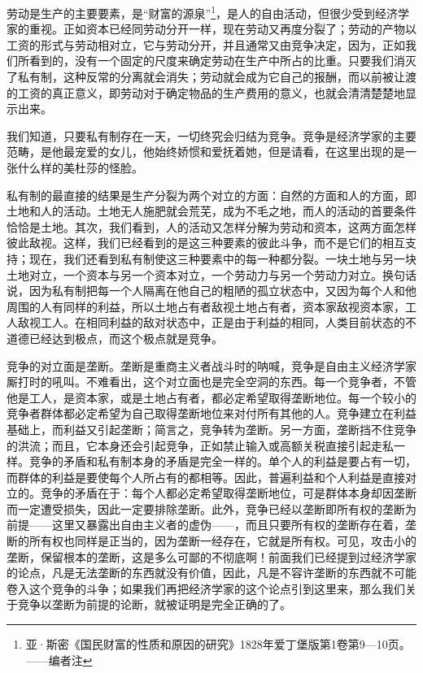 \documentclass[a4paper,twoside,12pt]{ctexart}
\begin{document}
劳动是生产的主要要素，是“财富的源泉”\footnote{亚·斯密《国民财富的性质和原因的研究》1828年爱丁堡版第1卷第9—10页。——编者注}，是人的自由活动，但很少受到经济学家的重视。正如资本已经同劳动分开一样，现在劳动又再度分裂了；劳动的产物以工资的形式与劳动相对立，它与劳动分开，并且通常又由竞争决定，因为，正如我们所看到的，没有一个固定的尺度来确定劳动在生产中所占的比重。只要我们消灭了私有制，这种反常的分离就会消失；劳动就会成为它自己的报酬，而以前被让渡的工资的真正意义，即劳动对于确定物品的生产费用的意义，也就会清清楚楚地显示出来。

我们知道，只要私有制存在一天，一切终究会归结为竞争。竞争是经济学家的主要范畴，是他最宠爱的女儿，他始终娇惯和爱抚着她，但是请看，在这里出现的是一张什么样的美杜莎的怪脸。

私有制的最直接的结果是生产分裂为两个对立的方面：自然的方面和人的方面，即土地和人的活动。土地无人施肥就会荒芜，成为不毛之地，而人的活动的首要条件恰恰是土地。其次，我们看到，人的活动又怎样分解为劳动和资本，这两方面怎样彼此敌视。这样，我们已经看到的是这三种要素的彼此斗争，而不是它们的相互支持；现在，我们还看到私有制使这三种要素中的每一种都分裂。一块土地与另一块土地对立，一个资本与另一个资本对立，一个劳动力与另一个劳动力对立。换句话说，因为私有制把每一个人隔离在他自己的粗陋的孤立状态中，又因为每个人和他周围的人有同样的利益，所以土地占有者敌视土地占有者，资本家敌视资本家，工人敌视工人。在相同利益的敌对状态中，正是由于利益的相同，人类目前状态的不道德已经达到极点，而这个极点就是竞争。

竞争的对立面是垄断。垄断是重商主义者战斗时的呐喊，竞争是自由主义经济学家厮打时的吼叫。不难看出，这个对立面也是完全空洞的东西。每一个竞争者，不管他是工人，是资本家，或是土地占有者，都必定希望取得垄断地位。每一个较小的竞争者群体都必定希望为自己取得垄断地位来对付所有其他的人。竞争建立在利益基础上，而利益又引起垄断；简言之，竞争转为垄断。另一方面，垄断挡不住竞争的洪流；而且，它本身还会引起竞争，正如禁止输入或高额关税直接引起走私一样。竞争的矛盾和私有制本身的矛盾是完全一样的。单个人的利益是要占有一切，而群体的利益是要使每个人所占有的都相等。因此，普遍利益和个人利益是直接对立的。竞争的矛盾在于：每个人都必定希望取得垄断地位，可是群体本身却因垄断而一定遭受损失，因此一定要排除垄断。此外，竞争已经以垄断即所有权的垄断为前提——这里又暴露出自由主义者的虚伪——，而且只要所有权的垄断存在着，垄断的所有权也同样是正当的，因为垄断一经存在，它就是所有权。可见，攻击小的垄断，保留根本的垄断，这是多么可鄙的不彻底啊！前面我们已经提到过经济学家的论点，凡是无法垄断的东西就没有价值，因此，凡是不容许垄断的东西就不可能卷入这个竞争的斗争；如果我们再把经济学家的这个论点引到这里来，那么我们关于竞争以垄断为前提的论断，就被证明是完全正确的了。
\end{document}
